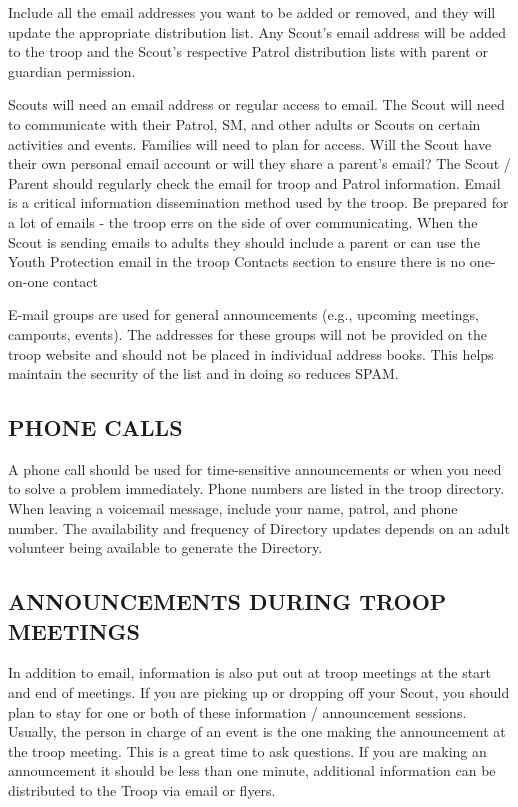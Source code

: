 \documentclass{ltxguide}
\begin{document}
Include all the email addresses you want to be added or removed, and they will update the appropriate distribution list. Any Scout's email address will be added to the troop and the Scout's respective Patrol distribution lists with parent or guardian permission.

Scouts will need an email address or regular access to email. The Scout will need to communicate with their Patrol, \ac{SM}, and other adults or Scouts on certain activities and events. Families will need to plan for access. Will the Scout have their own personal email account or will they share a parent's email? The Scout / Parent should regularly check the email for troop and Patrol information. Email is a critical information dissemination method used by the troop. Be prepared for a lot of emails - the troop errs on the side of over communicating. When the Scout is sending emails to adults they should include a parent or can use the Youth Protection email in the troop Contacts section to ensure there is no one-on-one contact

E-mail groups are used for general announcements (e.g., upcoming meetings, campouts, events). The addresses for these groups will not be provided on the troop website and should not be placed in individual address books. This helps maintain the security of the list and in doing so reduces SPAM.

\subsection{PHONE CALLS}
A phone call should be used for time-sensitive announcements or when you need to solve a problem immediately. Phone numbers are listed in the troop directory. When leaving a voicemail message, include your name, patrol, and phone number. The availability and frequency of Directory updates depends on an adult volunteer being available to generate the Directory. 

\subsection{ANNOUNCEMENTS DURING TROOP MEETINGS}
In addition to email, information is also put out at troop meetings at the start and end of meetings. If you are picking up or dropping off your Scout, you should plan to stay for one or both of these information / announcement sessions. Usually, the person in charge of an event is the one making the announcement at the troop meeting. This is a great time to ask questions. If you are making an announcement it should be less than one minute, additional information can be distributed to the Troop via email or flyers.
\end{document}
